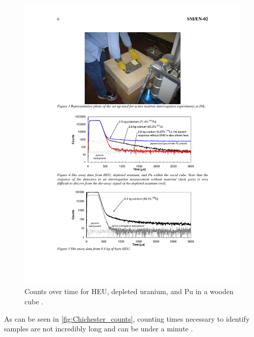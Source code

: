 \documentclass{report}
\begin{document}
\begin{figure}[h]
 \centering
 \includegraphics[trim = 3cm 11.3cm 3cm 10.5cm, clip,scale=1]{./figures/Chichester_counts.pdf}
   \caption{Counts over time for HEU, depleted uranium, and Pu in a wooden cube \cite{Chichester2009}.}
     \label{fig:Chichester_counts}
\end{figure}



As can be seen in \autoref{fig:Chichester_counts}, counting times necessary to identify samples are not incredibly long and can be under a minute \cite{Chichester2009}.
\end{document}
